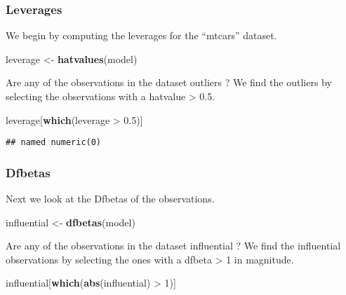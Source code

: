 \documentclass[a3paper]{article}
\newenvironment{Shaded}{\begin{snugshade}}{\end{snugshade}}
\newcommand{\KeywordTok}[1]{\textcolor[rgb]{0.13,0.29,0.53}{\textbf{{#1}}}}
\newcommand{\DecValTok}[1]{\textcolor[rgb]{0.00,0.00,0.81}{{#1}}}
\newcommand{\FloatTok}[1]{\textcolor[rgb]{0.00,0.00,0.81}{{#1}}}
\newcommand{\StringTok}[1]{\textcolor[rgb]{0.31,0.60,0.02}{{#1}}}
\newcommand{\NormalTok}[1]{{#1}}
\begin{document}
\subsubsection{Leverages}\label{leverages}

We begin by computing the leverages for the ``mtcars'' dataset.

\begin{Shaded}
\begin{Highlighting}[]
\NormalTok{leverage <-}\StringTok{ }\KeywordTok{hatvalues}\NormalTok{(model)}
\end{Highlighting}
\end{Shaded}

Are any of the observations in the dataset outliers ? We find the
outliers by selecting the observations with a hatvalue \textgreater{}
0.5.

\begin{Shaded}
\begin{Highlighting}[]
\NormalTok{leverage[}\KeywordTok{which}\NormalTok{(leverage >}\StringTok{ }\FloatTok{0.5}\NormalTok{)]}
\end{Highlighting}
\end{Shaded}

\begin{verbatim}
## named numeric(0)
\end{verbatim}

\subsubsection{Dfbetas}\label{dfbetas}

Next we look at the Dfbetas of the observations.

\begin{Shaded}
\begin{Highlighting}[]
\NormalTok{influential <-}\StringTok{ }\KeywordTok{dfbetas}\NormalTok{(model)}
\end{Highlighting}
\end{Shaded}

Are any of the observations in the dataset influential ? We find the
influential observations by selecting the ones with a dfbeta
\textgreater{} 1 in magnitude.

\begin{Shaded}
\begin{Highlighting}[]
\NormalTok{influential[}\KeywordTok{which}\NormalTok{(}\KeywordTok{abs}\NormalTok{(influential) >}\StringTok{ }\DecValTok{1}\NormalTok{)]}
\end{Highlighting}
\end{Shaded}
\end{document}
